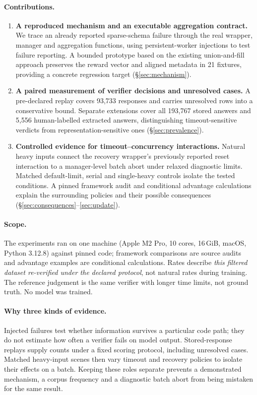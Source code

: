 \documentclass[10pt,a4paper]{article}
\begin{document}
\paragraph{Contributions.}
\begin{enumerate}[nosep,leftmargin=*]
\item \textbf{A reproduced mechanism and an executable aggregation contract.}
  We trace an already reported sparse-schema failure through the real
  wrapper, manager and aggregation functions, using persistent-worker
  injections to test failure reporting. A bounded prototype based on the
  existing union-and-fill approach preserves the reward vector and aligned
  metadata in 21 fixtures, providing a concrete regression target
  (\S\ref{sec:mechanism}).
\item \textbf{A paired measurement of verifier decisions and unresolved cases.}
  A pre-declared replay covers 93,733 responses and carries unresolved
  rows into a conservative bound. Separate extensions cover all 193,767
  stored answers and 5,556 human-labelled extracted answers, distinguishing
  timeout-sensitive verdicts from representation-sensitive ones
  (\S\ref{sec:prevalence}).
\item \textbf{Controlled evidence for timeout--concurrency interactions.}
  Natural heavy inputs connect the recovery wrapper's previously reported
  reset interaction to a manager-level batch abort under relaxed diagnostic
  limits. Matched default-limit, serial and single-heavy controls isolate
  the tested conditions. A pinned framework audit and conditional
  advantage calculations explain the surrounding policies and their
  possible consequences (\S\ref{sec:consequences}--\ref{sec:update}).
\end{enumerate}

\paragraph{Scope.}
The experiments ran on one machine (Apple M2 Pro, 10 cores,
16\,GiB, macOS, Python 3.12.8) against pinned code; framework comparisons
are source audits and advantage examples are conditional calculations. Rates describe
\emph{this filtered dataset re-verified under the declared protocol}, not
natural rates during training. The reference judgement is the same verifier
with longer time limits, not ground truth. No model was trained.

\paragraph{Why three kinds of evidence.}
Injected failures test whether information survives a particular code
path; they do not estimate how often a verifier fails on model output.
Stored-response replays supply counts under a fixed scoring protocol,
including unresolved cases. Matched heavy-input scenes then vary timeout
and recovery policies to isolate their effects on a batch. Keeping these
roles separate prevents a demonstrated mechanism, a corpus frequency and
a diagnostic batch abort from being mistaken for the same result.
\end{document}
